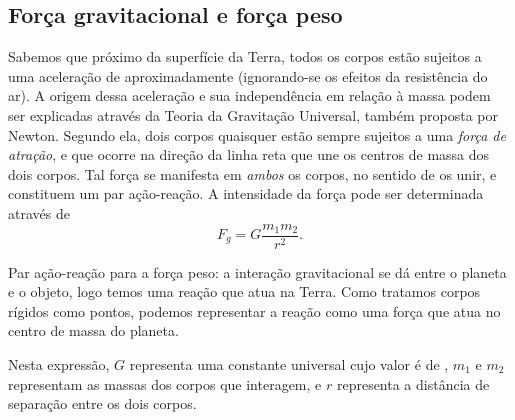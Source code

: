 \subsection{Força gravitacional e força peso} 

Sabemos que próximo da superfície da Terra, todos os corpos estão sujeitos a uma aceleração de aproximadamente  (ignorando-se os efeitos da resistência do ar). A origem dessa aceleração e sua independência em relação à massa podem ser explicadas através da Teoria da Gravitação Universal, também proposta por Newton. Segundo ela, dois corpos quaisquer estão sempre  sujeitos a uma \emph{força de atração}, e que ocorre na direção da linha reta que une os centros de massa dos dois corpos. Tal força se manifesta em \emph{ambos} os corpos, no sentido de os unir, e constituem um par ação-reação. A intensidade da força pode ser determinada através de
\begin{equation}\label{Eq:LeiGravitacaoUniversal}
  F_g = G \frac{m_1 m_2}{r^2}.
\end{equation}

\begin{marginfigure}
\centering
{}
\caption{Par ação-reação para a força peso: a interação gravitacional se dá entre o planeta e o objeto, logo temos uma reação que atua na Terra. Como tratamos corpos rígidos como pontos, podemos representar a reação como uma força que atua no centro de massa do planeta.}
\end{marginfigure}

\noindent{}Nesta expressão, $G$ representa uma constante universal cujo valor é de , $m_1$ e $m_2$ representam as massas dos corpos que interagem, e $r$ representa a distância de separação entre os dois corpos.

